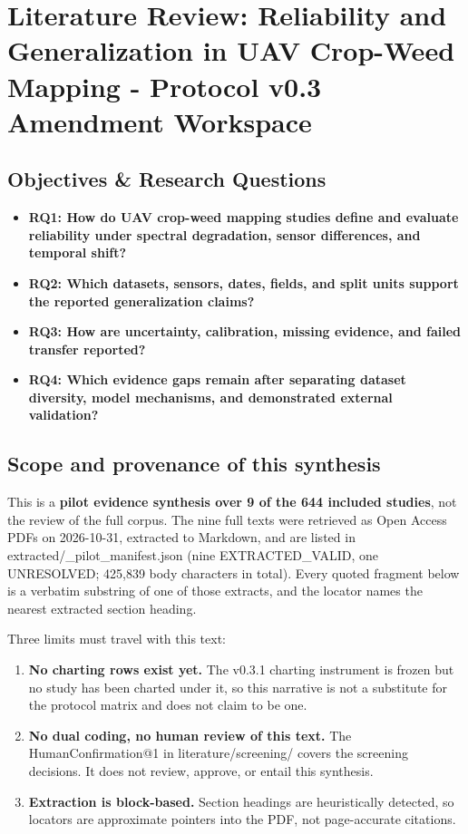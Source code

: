 \documentclass{article}
\begin{document}
\section{Literature Review: Reliability and Generalization in UAV Crop-Weed Mapping - Protocol v0.3 Amendment Workspace}

\subsection{Objectives \& Research Questions}
\begin{itemize}
\item \textbf{RQ1: How do UAV crop-weed mapping studies define and evaluate reliability under spectral degradation, sensor differences, and temporal shift?}
\item \textbf{RQ2: Which datasets, sensors, dates, fields, and split units support the reported generalization claims?}
\item \textbf{RQ3: How are uncertainty, calibration, missing evidence, and failed transfer reported?}
\item \textbf{RQ4: Which evidence gaps remain after separating dataset diversity, model mechanisms, and demonstrated external validation?}
\end{itemize}

\subsection{Scope and provenance of this synthesis}

This is a \textbf{pilot evidence synthesis over 9 of the 644 included studies}, not the review
of the full corpus. The nine full texts were retrieved as Open Access PDFs on
2026-10-31, extracted to Markdown, and are listed in
extracted/\_pilot\_manifest.json (nine EXTRACTED\_VALID, one UNRESOLVED; 425,839
body characters in total). Every quoted fragment below is a verbatim substring of
one of those extracts, and the locator names the nearest extracted section heading.

Three limits must travel with this text:

\begin{enumerate}
\item \textbf{No charting rows exist yet.} The v0.3.1 charting instrument is frozen but no
   study has been charted under it, so this narrative is not a substitute for the
   protocol matrix and does not claim to be one.
\item \textbf{No dual coding, no human review of this text.} The HumanConfirmation@1 in
   literature/screening/ covers the screening decisions. It does not review,
   approve, or entail this synthesis.
\item \textbf{Extraction is block-based.} Section headings are heuristically detected, so
   locators are approximate pointers into the PDF, not page-accurate citations.
\end{enumerate}
\end{document}
